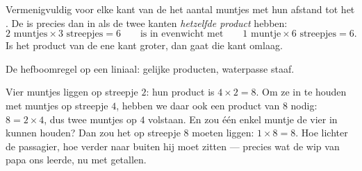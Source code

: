 \begin{proposition}[De hefboomregel]\label{prop:g3:levers-and-scales:rule}
Vermenigvuldig voor elke kant van de  het aantal muntjes met hun
afstand tot het . De  is precies dan in  als de
twee kanten \emph{hetzelfde product} hebben:
\[
2 \text{ muntjes} \times 3 \text{ streepjes} = 6
\qquad\text{is in evenwicht met}\qquad
1 \text{ muntje} \times 6 \text{ streepjes} = 6 .
\]
Is het product van de ene kant groter, dan gaat die kant omlaag.
\end{proposition}

\begin{omfigure}

{\small De hefboomregel op een liniaal: gelijke producten, waterpasse
staaf.}
\end{omfigure}

\begin{example}\label{ex:g3:levers-and-scales:using}
Vier muntjes liggen op streepje $2$: hun product is $4 \times 2 = 8$.
Om ze in  te houden met muntjes op streepje $4$, hebben we
daar ook een product van $8$ nodig: $8 = 2 \times 4$, dus twee muntjes
op $4$ volstaan. En zou één enkel muntje de vier in  kunnen
houden? Dan zou het op streepje $8$ moeten liggen: $1 \times 8 = 8$.
Hoe lichter de passagier, hoe verder naar buiten hij moet zitten ---
precies wat de wip van papa ons leerde, nu met getallen.
\end{example}

